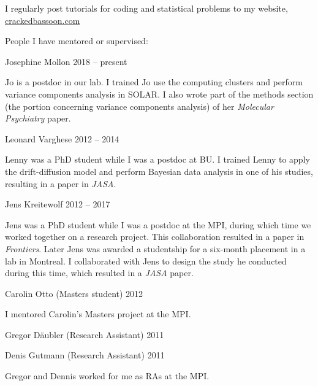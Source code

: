 \documentclass[10pt]{article}
\makeatletter
\newlength{\bibhang}
\newlength{\bibsep}
 {\@listi \global\bibsep\itemsep \global\advance\bibsep by\parsep}
\newenvironment{bibsection}%
        {\vspace{-\baselineskip}\begin{list}{}{%
       \setlength{\leftmargin}{\bibhang}%
       \setlength{\itemindent}{-\leftmargin}%
       \setlength{\itemsep}{\bibsep}%
       \setlength{\parsep}{\z@}%
        \setlength{\partopsep}{0pt}%
        \setlength{\topsep}{0pt}}}
        {\end{list}\vspace{-.6\baselineskip}}
\newenvironment{outerlist}[1][\enskip\textbullet]%
        {\begin{itemize}[#1]}{\end{itemize}%
         \vspace{-.6\baselineskip}}
\newenvironment{innerlist}[1][\enskip\textbullet]%
        {\begin{compactitem}[#1]}{\end{compactitem}}
\makeatother
\begin{document}
\begin{bibsection}
\item I regularly post tutorials for coding and statistical problems to my website, \href{mailto:https://crackedbassoon.com}{crackedbassoon.com}
\item People I have mentored or supervised:
\begin{outerlist}
\item[]Josephine Mollon \hfill{2018 -- present}
\begin{innerlist}\item Jo is a postdoc in our lab. I trained Jo use the computing clusters and perform variance components analysis in SOLAR. I also wrote part of the methods section (the portion concerning variance components analysis) of her \emph{Molecular Psychiatry} paper.\end{innerlist}
\item[]Leonard Varghese \hfill{2012 -- 2014}
\begin{innerlist}\item Lenny was a PhD student while I was a postdoc at BU. I trained Lenny to apply the drift-diffusion model and perform Bayesian data analysis in one of his studies, resulting in a paper in \emph{JASA}.\end{innerlist}
\item[]Jens Kreitewolf \hfill{2012 -- 2017}
\begin{innerlist}\item Jens was a PhD student while I was a postdoc at the MPI, during which time we worked together on a research project. This collaboration resulted in a paper in \emph{Frontiers}. Later Jens was awarded a studentship for a six-month placement in a lab in Montreal. I collaborated with Jens to design the study he conducted during this time, which resulted in a \emph{JASA} paper.\end{innerlist}
\item[]Carolin Otto (Masters student)  \hfill{2012}
\begin{innerlist}\item I mentored Carolin's Masters project at the MPI.\end{innerlist}
\item[]Gregor Däubler (Research Assistant) \hfill{2011}
\item[]Denis Gutmann (Research Assistant) \hfill{2011}
\begin{innerlist}\item Gregor and Dennis worked for me as RAs at the MPI.\end{innerlist}
\end{outerlist}



\end{bibsection}
\end{document}
